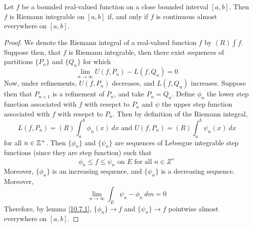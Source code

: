 \begin{theorem}\label{10.7.3}
    Let $f$ be a bounded real-valued function on a close bounded interval
    $[a,b]$. Then $f$ is Riemann integrable on  $[a,b]$ if, and only if $f$ is
    continuous almost everywhere on $[a,b]$.
\end{theorem}
\begin{proof}
    We denote the Riemann integral of a real-valued function $f$ by
    $(R)\int{f}$. Suppose then, that $f$ is Riemann integrable, then there exist
    sequences of partitions  $\{P_n\}$ and $\{Q_n\}$ for which
    \begin{equation*}
        \lim_{n \xrightarrow{} \infty}{U(f,P_n)-L(f,Q_n)}=0
    \end{equation*}
    Now, under refinements, $U(f,P_n)$ decreases, and $L(f,Q_n)$ increases.
    Suppose then that $P_{n+1}$ is a refinement of $P_n$, and take  $P_n=Q_n$.
    Define  $\phi_n$ the lower step function associated with $f$ with resepct to
    $P_n$ and $\psi$ the upper step function associated with $f$ with resepct to
    $P_n$. Then by definition of the Riemann integral,
    \begin{equation*}
        L(f,P_n)=(R)\int_a^b{\phi_n(x) \ dx} \text{ and }
        U(f,P_n)=(R)\int_a^b{\psi_n(x) \ dx}
    \end{equation*}
    for all $n \in \mathbb{Z}^+$. Then $\{\phi_n\}$ and $\{\psi_n\}$ are sequences of
    Lebesgue integrable step functions (since they are step function) such that
    \begin{equation*}
        \phi_n \leq f \leq \psi_n \text{ on } E \text{ for all } n \in Z^+
    \end{equation*}
    Moreover, $\{\phi_n\}$ is an increasing sequence, and $\{\psi_n\}$ is a
    decreasing sequence. Moreover,
    \begin{equation*}
        \lim_{n \xrightarrow{} \infty}{\int_E{\psi_n-\phi_n \ dm}}=0
    \end{equation*}
    Therefore, by lemma \ref{10.7.1}, $\{\phi_n\} \xrightarrow{} f$ and
    $\{\psi_n\} \xrightarrow{} f$ pointwise almost everywhere on $[a,b]$.


\end{proof}
